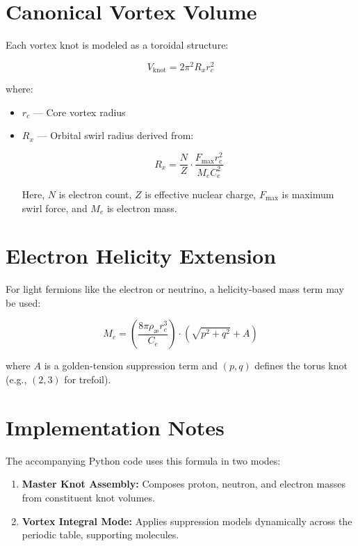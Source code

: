 \documentclass[12pt]{article}
\begin{document}
\section{Canonical Vortex Volume}
Each vortex knot is modeled as a toroidal structure:

\begin{equation}
    V_{\text{knot}} = 2 \pi^2 R_x r_c^2
\end{equation}

where:
\begin{itemize}
    \item $r_c$ — Core vortex radius
    \item $R_x$ — Orbital swirl radius derived from:

    \[
    R_x = \frac{N}{Z} \cdot \frac{F_{\max} r_c^2}{M_e C_e^2}
    \]

    Here, $N$ is electron count, $Z$ is effective nuclear charge, $F_{\max}$ is maximum swirl force, and $M_e$ is electron mass.
\end{itemize}

\section{Electron Helicity Extension}
For light fermions like the electron or neutrino, a helicity-based mass term may be used:

\begin{equation}
    M_e = \left( \frac{8\pi \rho_{\text{æ}} r_c^3}{C_e} \right) \cdot \left( \sqrt{p^2 + q^2} + A \right)
\end{equation}

where $A$ is a golden-tension suppression term and $(p, q)$ defines the torus knot (e.g., $(2,3)$ for trefoil).

\section{Implementation Notes}
The accompanying Python code uses this formula in two modes:
\begin{enumerate}
    \item \textbf{Master Knot Assembly:} Composes proton, neutron, and electron masses from constituent knot volumes.
    \item \textbf{Vortex Integral Mode:} Applies suppression models dynamically across the periodic table, supporting molecules.
\end{enumerate}
\end{document}
